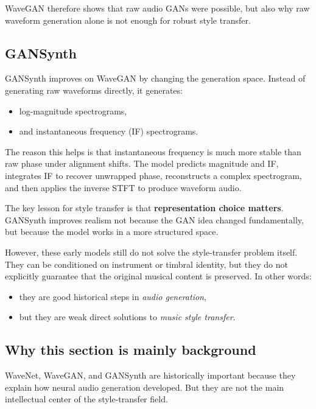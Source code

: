 \documentclass[11pt]{article}
\begin{document}
WaveGAN therefore shows that raw audio GANs were possible, but also why raw waveform generation alone is not enough for robust style transfer.

\subsection{GANSynth}

GANSynth improves on WaveGAN by changing the generation space. Instead of generating raw waveforms directly, it generates:

\begin{itemize}
\item log-magnitude spectrograms,
\item and instantaneous frequency (IF) spectrograms.
\end{itemize}

The reason this helps is that instantaneous frequency is much more stable than raw phase under alignment shifts. The model predicts magnitude and IF, integrates IF to recover unwrapped phase, reconstructs a complex spectrogram, and then applies the inverse STFT to produce waveform audio.

The key lesson for style transfer is that \textbf{representation choice matters}. GANSynth improves realism not because the GAN idea changed fundamentally, but because the model works in a more structured space.

However, these early models still do not solve the style-transfer problem itself. They can be conditioned on instrument or timbral identity, but they do not explicitly guarantee that the original musical content is preserved. In other words:

\begin{itemize}
\item they are good historical steps in \emph{audio generation},
\item but they are weak direct solutions to \emph{music style transfer}.
\end{itemize}

\subsection{Why this section is mainly background}

WaveNet, WaveGAN, and GANSynth are historically important because they explain how neural audio generation developed. But they are not the main intellectual center of the style-transfer field.
\end{document}
